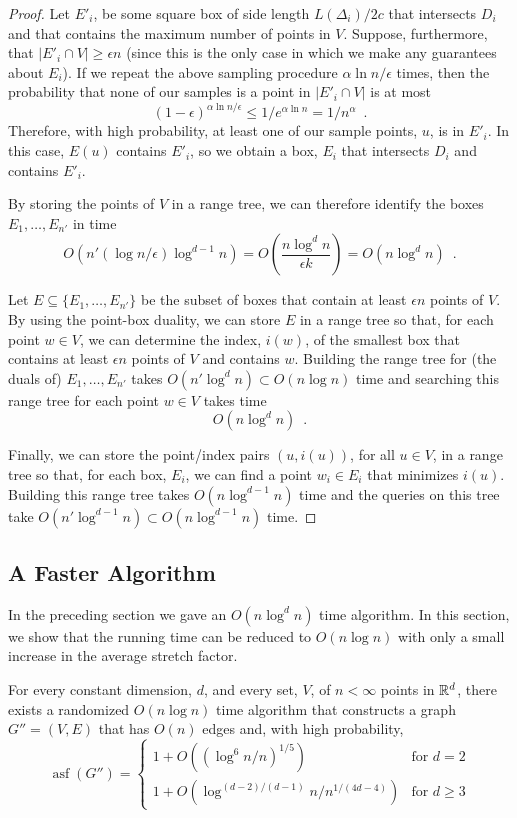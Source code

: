\documentclass{patmorin}
\DeclareMathOperator{\asf}{asf}
\begin{document}
\begin{proof}
  Let $E'_i$, be some square box of side length $L(\Delta_i)/2c$ that
  intersects $D_i$ and that contains the maximum number of points in $V$.
  Suppose, furthermore, that $|E'_i\cap V|\ge \epsilon n$ (since this
  is the only case in which we make any guarantees about $E_i$).  If we
  repeat the above sampling procedure $\alpha\ln n/\epsilon$ times, then
  the probability that none of our samples is a point in $|E'_i\cap V|$
  is at most
  \[
      (1-\epsilon)^{\alpha\ln n/\epsilon} 
         \le 1/e^{\alpha\ln n} = 1/n^{\alpha} \enspace .
  \]
  Therefore, with high probability, at least one of our sample points,
  $u$, is in $E'_i$.  In this case, $E(u)$ contains $E'_i$, so we obtain
  a box, $E_i$ that intersects $D_i$ and contains $E'_i$.

  By storing the points of $V$ in a range tree, we can therefore identify
  the boxes $E_1,\ldots,E_{n'}$ in time
  \[
     O(n'(\log n/\epsilon)\log^{d-1} n) 
        = O\left(\frac{n\log^{d}n}{\epsilon k} \right) = O(n\log^d n) \enspace .
  \]

  Let $E\subseteq\{E_1,\ldots,E_{n'}\}$ be the subset of boxes that
  contain at least $\epsilon n$ points of $V$. By using the point-box
  duality, we can store $E$ in a range tree so that, for each point
  $w\in V$, we can determine the index, $i(w)$, of the smallest box
  that contains at least $\epsilon n$ points of $V$ and contains $w$.
  Building the range tree for (the duals of) $E_1,\ldots,E_{n'}$ takes
  $O(n'\log^d n)\subset O(n\log n)$ time and searching this range tree for
  each point $w\in V$ takes time
  \[
     O(n\log^d n) \enspace .
  \]

  Finally, we can store the point/index pairs $(u,i(u))$, for all
  $u\in V$, in a range tree so that, for each box, $E_i$, we can find
  a point $w_i\in E_i$ that minimizes $i(u)$.  Building this range
  tree takes $O(n\log^{d-1} n)$ time and the queries on this tree take
  $O(n'\log^{d-1} n)\subset O(n\log^{d-1} n)$ time.
\end{proof}

\subsection{A Faster Algorithm}

In the preceding section we gave an $O(n\log^d n)$ time algorithm.
In this section, we show that the running time can be reduced to $O(n\log
n)$ with only a small increase in the average stretch factor.

\begin{thm}
  For every constant dimension, $d$, and every set, $V$, of $n<\infty$
  points in $\mathbb{R}^d$, there exists a randomized $O(n\log n)$ time
  algorithm that constructs a graph $G''=(V,E)$ that has $O(n)$ edges
  and, with high probability, 
  \[
      \asf(G'')=\begin{cases}
         1+ O((\log^{6} n/n)^{1/5}) & \text{for $d=2$} \\
         1+ O(\log^{(d-2)/(d-1)}n/n^{1/(4d-4)}) 
                  & \text{for $d\ge 3$} 
      \end{cases}
  \]
\end{thm}
\end{document}
